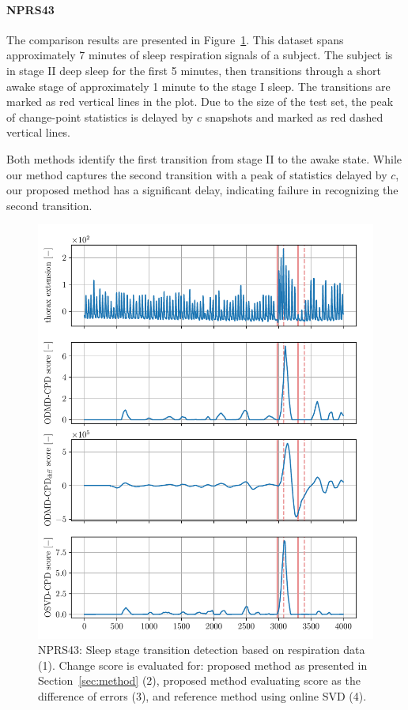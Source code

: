 \paragraph{NPRS43}
The comparison results are presented in Figure~\ref{fig:nprs43}. This dataset spans approximately 7 minutes of sleep respiration signals of a subject. The subject is in stage II deep sleep for the first 5 minutes, then transitions through a short awake stage of approximately 1 minute to the stage I sleep. The transitions are marked as red vertical lines in the plot. Due to the size of the test set, the peak of change-point statistics is delayed by \(c\) snapshots and marked as red dashed vertical lines.

Both methods identify the first transition from stage II to the awake state. While our method captures the second transition with a peak of statistics delayed by \(c\), our proposed method has a significant delay, indicating failure in recognizing the second transition.

\begin{figure}
    \centering
    \includegraphics[width=\linewidth]{figures/nprs43-chd_r2-roll_301-dmd_w1.0-h80.pdf}
    \caption{NPRS43: Sleep stage transition detection based on respiration data (1). Change score is evaluated for: proposed method as presented in Section~\ref{sec:method} (2), proposed method evaluating score as the difference of errors (3), and reference method using online SVD (4).}\label{fig:nprs43}
\end{figure}

